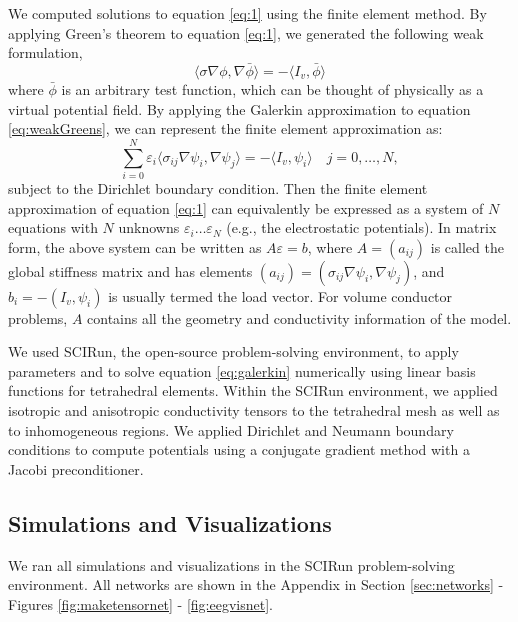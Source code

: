 We computed solutions to equation \ref{eq:1} using the finite element method. By applying Green's theorem to equation \ref{eq:1}, we generated the following weak formulation,
\begin{equation}
\label{eq:weakGreens}
\langle \sigma \nabla \phi, \nabla \bar{\phi} \rangle = -\langle I_v, \bar{\phi} \rangle
\end{equation}
where $ \bar{\phi}$ is an arbitrary test function, which can be thought of physically as a virtual potential field. By applying the Galerkin approximation to equation \ref{eq:weakGreens}, we can represent the finite element approximation as:
\begin{equation}
\label{eq:galerkin}
\sum_{i = 0}^{N} \varepsilon_i \langle \sigma_{ij} \nabla \psi_{i}, \nabla \psi_{j} \rangle = -\langle I_v, \psi_i \rangle \quad j = 0, \dots, N,
\end{equation}
subject to the Dirichlet boundary condition. Then the finite element approximation of equation \ref{eq:1} can equivalently be expressed as a system of $N$ equations with $N$ unknowns $\varepsilon_i \dots \varepsilon_N$ (e.g., the electrostatic potentials). In matrix form, the above system can be written as $A \varepsilon = b$,  where $A=(a_{ij})$ is called the global stiffness matrix and has elements $(a_{ij}) = (\sigma_{ij} \nabla \psi_{i}, \nabla \psi_{j})$, and $b_i = -(I_v, \psi_i)$ is usually termed the load vector. For volume conductor problems, $A$ contains all the geometry and conductivity information of the model. \cite{SCI:Joh2015c}

We used SCIRun, the open-source problem-solving environment, to apply parameters and to solve equation \ref{eq:galerkin} numerically using linear basis functions for tetrahedral elements. Within the SCIRun environment, we applied isotropic and anisotropic conductivity tensors to the tetrahedral mesh as well as to inhomogeneous regions. We applied Dirichlet and Neumann boundary conditions to compute potentials using a conjugate gradient method with a Jacobi preconditioner.

\subsection{Simulations and Visualizations}
\label{sec:sim}

We ran all simulations and visualizations in the SCIRun problem-solving environment. All networks are shown in the Appendix in Section \ref{sec:networks} - Figures \ref{fig:maketensornet} - \ref{fig:eegvisnet}.

